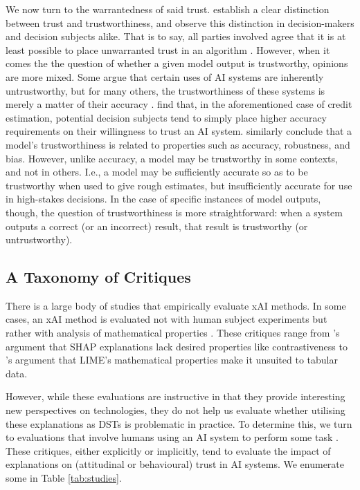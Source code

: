 We now turn to the warrantedness of said trust. \textcite{Vereschak_Alizadeh_Bailly_Caramiaux_2024} establish a clear distinction between trust and trustworthiness, and observe this distinction in decision-makers and decision subjects alike. That is to say, all parties involved agree that it is at least possible to place unwarranted trust in an algorithm \cite{Vereschak_Alizadeh_Bailly_Caramiaux_2024}. However, when it comes the the question of whether a given model output is trustworthy, opinions are more mixed. Some argue that certain uses of AI systems are inherently untrustworthy, but for many others, the trustworthiness of these systems is merely a matter of their accuracy \cite{Rebitschek_Gigerenzer_Wagner_2021}. \textcite{Rebitschek_Gigerenzer_Wagner_2021} find that, in the aforementioned case of credit estimation, potential decision subjects tend to simply place higher accuracy requirements on their willingness to trust an AI system. \textcite{Jacovi-et-al} similarly conclude that a model's trustworthiness is related to properties such as accuracy, robustness, and bias. However, unlike accuracy, a model may be trustworthy in some contexts, and not in others. I.e., a model may be sufficiently accurate so as to be trustworthy when used to give rough estimates, but insufficiently accurate for use in high-stakes decisions. In the case of specific instances of model outputs, though, the question of trustworthiness is more straightforward: when a system outputs a correct (or an incorrect) result, that result is trustworthy (or untrustworthy).

\subsection{A Taxonomy of Critiques}
There is a large body of studies that empirically evaluate xAI methods. In some cases, an xAI method is evaluated not with human subject experiments but rather with analysis of mathematical properties \cite{Doshi-Velez-and-Kim}. These critiques range from \textcite{kumar_problems_2020}'s argument that SHAP explanations lack desired properties like contrastiveness to \textcite{Lundberg-and-Lee}'s argument that LIME's mathematical properties make it unsuited to tabular data.

However, while these evaluations are instructive in that they provide interesting new perspectives on technologies, they do not help us evaluate whether utilising these explanations as DSTs is problematic in practice. To determine this, we turn to evaluations that involve humans using an AI system to perform some task \cite{Ribeiro-et-al-lime,Ribeiro-et-al-anchors, rader-et-al, Jacobs-et-al, Bansal-et-al}. These critiques, either explicitly or implicitly, tend to evaluate the impact of explanations on (attitudinal or behavioural) trust in AI systems. We enumerate some in Table \ref{tab:studies}.

